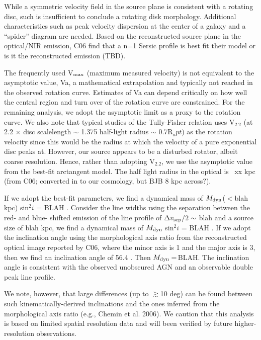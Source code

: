 \documentclass[]{emulateapj}
\begin{document}
While a symmetric velocity field in the source plane is consistent with a rotating disc, such is insufficient to conclude a rotating disk morphology. Additional characteristics such
as peak velocity dispersion at the center of a galaxy and a ``spider'' diagram are needed. Based on the reconstructed source plane in the optical/NIR emission, C06 find that a
n=1 Sersic profile is best fit their model or is it the reconstructed emission (TBD).

The frequently used V$_{\rm max}$ (maximum measured velocity) is not equivalent to the
asymptotic value, Va, a mathematical extrapolation and typically not reached in
the observed rotation curve. Estimates of Va can depend critically on how well
the central region and turn over of the rotation curve are constrained. For the
remaining analysis, we adopt the asymptotic limit as a proxy to the rotation
curve. We also note that typical studies of the Tully-Fisher relation uses V$_2.2$ (at 2.2 $\times$ disc scalelength $\sim$ 1.375 half-light radius $\sim$ 0.7R$_opt$) as the rotation
velocity since this would be the radius at which the velocity of a pure
exponential disc peaks at. However, our source appears to be a disturbed
rotator, albeit coarse resolution. Hence, rather than adopting V$_2.2$, we use the
asymptotic value from the best-fit arctangent model. The half light radius in the
optical is ~xx kpc (from C06; converted in to our cosmology, but BJB 8 kpc
across?).

If we adopt the best-fit parameters, we find a dynamical mass of $M_{\rm dyn}$($<$blah kpc) sin$^2 i$ = BLAH \Msun. Consider the line widths using the separation between
the red- and blue- shifted emission of the \bco line profile of $\Delta v_{\rm sep}/2 \sim$ blah \kms and a source size of blah kpc, we find a dynamical mass of $M_{\rm dyn}$
sin$^2 i$ = BLAH \Msun. If we adopt the inclination angle using the morphological axis ratio from the
reconstructed optical image reported by C06, where the minor axis is 1 and the major axis is 3, then we find an inclination angle of 56.4
\degr. Then $M_{\rm dyn}$\,=\,BLAH. The inclination angle is consistent with the observed unobscured AGN and an observable double peak line profile.

We note, however, that large differences (up to $\gtrsim$10 deg) can be found between such kinematically-derived inclinations and the ones inferred from the morphological
axis ratio (e.g., Chemin et al. 2006). We caution that this analysis is based on limited spatial resolution data and will been verified by future higher-resolution observations.
\end{document}
